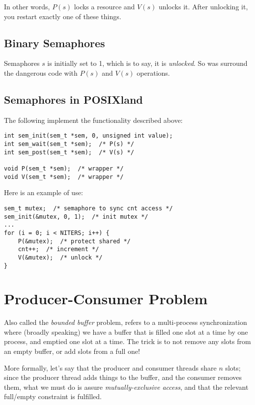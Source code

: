\documentclass[fleqn]{article}
\begin{document}
In other words, $P(s)$ locks a resource and $V(s)$ unlocks it. After unlocking it, you restart exactly one of these things.

\subsection{Binary Semaphores}

Semaphores $s$ is initially set to 1, which is to say, it is \textit{unlocked}. So was surround the dangerous code with $P(s)$ and $V(s)$ operations.

\subsection{Semaphores in POSIXland}

The following implement the functionality described above:

\begin{verbatim}
int sem_init(sem_t *sem, 0, unsigned int value);
int sem_wait(sem_t *sem);  /* P(s) */
int sem_post(sem_t *sem);  /* V(s) */

void P(sem_t *sem);  /* wrapper */
void V(sem_t *sem);  /* wrapper */
\end{verbatim}

Here is an example of use:

\begin{verbatim}
sem_t mutex;  /* semaphore to sync cnt access */
sem_init(&mutex, 0, 1);  /* init mutex */
...
for (i = 0; i < NITERS; i++) {
    P(&mutex);  /* protect shared */
    cnt++;  /* increment */
    V(&mutex);  /* unlock */
}
\end{verbatim}

\section{Producer-Consumer Problem}

Also called the \textit{bounded buffer} problem, refers to a multi-process synchronization where (broadly speaking) we have a buffer that is filled one slot at a time by one process, and emptied one slot at a time. The trick is to not remove any slots from an empty buffer, or add slots from a full one!

More formally, let's say that the producer and consumer threads share $n$ slots; since the producer thread adds things to the buffer, and the consumer removes them, what we must do is assure \textit{mutually-exclusive access}, and that the relevant full/empty constraint is fulfilled.
\end{document}

